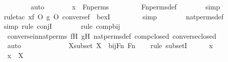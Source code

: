 \begin{isabellebody}
\ \ \ \ \ \ \isamarkupfalse%
\ auto\isanewline
\ \ \ \ \isamarkupfalse%
\ \isamarkupfalse%
\ {\isachardoublequoteopen}x\ {\isasymin}\ Fn{\isacharunderscore}{\kern0pt}perms{\isachardoublequoteclose}\ \isanewline
\ \ \ \ \ \ \isamarkupfalse%
\ Fn{\isacharunderscore}{\kern0pt}perms{\isacharunderscore}{\kern0pt}def\isanewline
\ \ \ \ \ \ \isamarkupfalse%
\ simp\isanewline
\ \ \ \ \ \ \isamarkupfalse%
{\isacharparenleft}{\kern0pt}rule{\isacharunderscore}{\kern0pt}tac\ x{\isacharequal}{\kern0pt}{\isachardoublequoteopen}f\ O\ g\ O\ converse{\isacharparenleft}{\kern0pt}f{\isacharparenright}{\kern0pt}{\isachardoublequoteclose}\ \ bexI{\isacharparenright}{\kern0pt}\isanewline
\ \ \ \ \ \ \ \isamarkupfalse%
\ simp\isanewline
\ \ \ \ \ \ \isamarkupfalse%
\ nat{\isacharunderscore}{\kern0pt}perms{\isacharunderscore}{\kern0pt}def\ \isanewline
\ \ \ \ \ \ \isamarkupfalse%
{\isacharparenleft}{\kern0pt}simp{\isacharcomma}{\kern0pt}\ rule\ conjI{\isacharparenright}{\kern0pt}\isanewline
\ \ \ \ \ \ \ \isamarkupfalse%
{\isacharparenleft}{\kern0pt}rule\ comp{\isacharunderscore}{\kern0pt}bij{\isacharparenright}{\kern0pt}{\isacharplus}{\kern0pt}\isanewline
\ \ \ \ \ \ \isamarkupfalse%
\ converse{\isacharunderscore}{\kern0pt}in{\isacharunderscore}{\kern0pt}nat{\isacharunderscore}{\kern0pt}perms\ fH\ gH\ nat{\isacharunderscore}{\kern0pt}perms{\isacharunderscore}{\kern0pt}def\ comp{\isacharunderscore}{\kern0pt}closed\ converse{\isacharunderscore}{\kern0pt}closed\isanewline
\ \ \ \ \ \ \ \ \ \isamarkupfalse%
\ auto{\isacharbrackleft}{\kern0pt}{}{\isacharbrackright}{\kern0pt}\isanewline
\ \ \ \ \ \ \isamarkupfalse%
\isanewline
\ \ \isamarkupfalse%
\isanewline
\isanewline
\ \ \isamarkupfalse%
\ Xsubset{\isacharprime}{\kern0pt}{\isacharcolon}{\kern0pt}\ {\isachardoublequoteopen}X\ {\isasymsubseteq}\ bij{\isacharparenleft}{\kern0pt}Fn{\isacharcomma}{\kern0pt}\ Fn{\isacharparenright}{\kern0pt}{\isachardoublequoteclose}\ \isanewline
\ \ \isamarkupfalse%
{\isacharparenleft}{\kern0pt}rule\ subsetI{\isacharparenright}{\kern0pt}\isanewline
\ \ \ \ \isamarkupfalse%
\ x\ \isanewline
\ \ \ \ \isamarkupfalse%
\ {\isachardoublequoteopen}x\ {\isasymin}\ X{\isachardoublequoteclose}\ \isanewline
\ \ \ \ \isamarkupfalse%
\ \isamarkupfalse%

\end{isabellebody}
